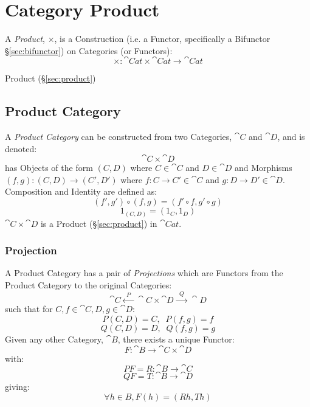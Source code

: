 \section{Category Product}\label{sec:category_product}

A \emph{Product}, $\times$, is a Construction (i.e. a Functor,
specifically a Bifunctor \S\ref{sec:bifunctor}) on Categories (or
Functors):
\[
  \times : \cat{Cat} \times \cat{Cat} \rightarrow \cat{Cat}
\]

Product (\S\ref{sec:product})



\subsection{Product Category}\label{sec:product_category}

A \emph{Product Category} can be constructed from two Categories,
$\cat{C}$ and $\cat{D}$, and is denoted:
\[
  \cat{C} \times \cat{D}
\]
has Objects of the form $(C,D)$ where $C \in \cat{C}$ and $D \in
\cat{D}$ and Morphisms $(f,g) : (C,D) \rightarrow (C',D')$ where $f
: C \rightarrow C' \in \cat{C}$ and $g : D \rightarrow D' \in
\cat{D}$. Composition and Identity are defined as:
\[
  (f',g') \circ (f,g) = (f' \circ f,g' \circ g)
\]\[
  1_{(C,D)} = (1_C, 1_D)
\]
$\cat{C} \times \cat{D}$ is a Product (\S\ref{sec:product}) in
$\cat{Cat}$.



\subsubsection{Projection}\label{sec:projection_functor}

A Product Category has a pair of \emph{Projections} which are Functors
from the Product Category to the original Categories:
\[
  \cat{C} \xleftarrow{\;\; P\;\;} \cat{C}\times\cat{D}
  \xrightarrow{\;\; Q\;\;} \cat{D}
\]
such that for $C,f \in \cat{C}, D,g \in \cat{D}$:
\[
  P(C,D) = C, \;\; P(f,g) = f
\]\[
  Q(C,D) = D, \;\; Q(f,g) = g
\]
Given any other Category, $\cat{B}$, there exists a unique Functor:
\[
  F : \cat{B} \rightarrow \cat{C} \times \cat{D}
\]
with:
\[
  PF = R : \cat{B} \rightarrow \cat{C}
\]\[
  QF = T : \cat{B} \rightarrow \cat{D}
\]
giving:
\[
  \forall h \in B, F(h) = (Rh,Th)
\]



